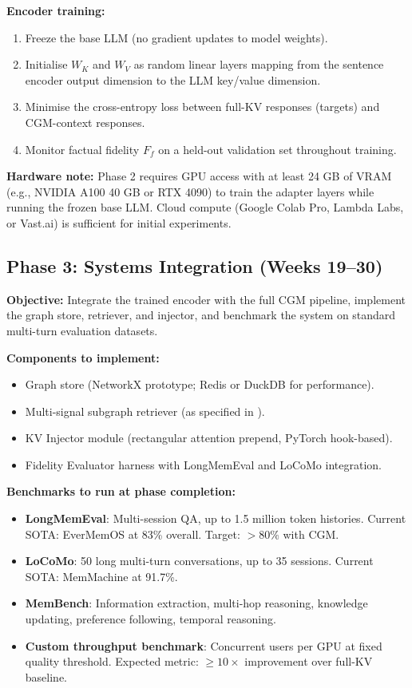 \documentclass[11pt, a4paper, twoside]{article}
\theoremstyle{definition}
\newcommand{\CGM}{\textsc{CGM}\xspace}
\begin{document}
\textbf{Encoder training:}
\begin{enumerate}[leftmargin=*]
  \item Freeze the base LLM (no gradient updates to model weights).
  \item Initialise $W_K$ and $W_V$ as random linear layers mapping from the
    sentence encoder output dimension to the LLM key/value dimension.
  \item Minimise the cross-entropy loss between full-KV responses (targets)
    and \CGM-context responses.
  \item Monitor factual fidelity $F_f$ on a held-out validation set throughout
    training.
\end{enumerate}

\textbf{Hardware note:} Phase 2 requires GPU access with at least 24 GB of VRAM
(e.g., NVIDIA A100 40 GB or RTX 4090) to train the adapter layers while running
the frozen base LLM. Cloud compute (Google Colab Pro, Lambda Labs, or Vast.ai)
is sufficient for initial experiments.

\subsection{Phase 3: Systems Integration (Weeks 19--30)}
\label{sec:phase3}

\textbf{Objective:} Integrate the trained encoder with the full \CGM pipeline,
implement the graph store, retriever, and injector, and benchmark the system on
standard multi-turn evaluation datasets.

\medskip

\textbf{Components to implement:}
\begin{itemize}[leftmargin=*]
  \item Graph store (NetworkX prototype; Redis or DuckDB for performance).
  \item Multi-signal subgraph retriever (as specified in ).
  \item KV Injector module (rectangular attention prepend, PyTorch hook-based).
  \item Fidelity Evaluator harness with LongMemEval and LoCoMo integration.
\end{itemize}

\textbf{Benchmarks to run at phase completion:}
\begin{itemize}[leftmargin=*]
  \item \textbf{LongMemEval}: Multi-session QA, up to 1.5 million token histories.
    Current SOTA: EverMemOS at 83\% overall. Target: $>80\%$ with \CGM.
  \item \textbf{LoCoMo}: 50 long multi-turn conversations, up to 35 sessions.
    Current SOTA: MemMachine at 91.7\%.
  \item \textbf{MemBench}: Information extraction, multi-hop reasoning, knowledge
    updating, preference following, temporal reasoning.
  \item \textbf{Custom throughput benchmark}: Concurrent users per GPU at
    fixed quality threshold. Expected metric: $\geq 10\times$ improvement
    over full-KV baseline.
\end{itemize}
\end{document}
